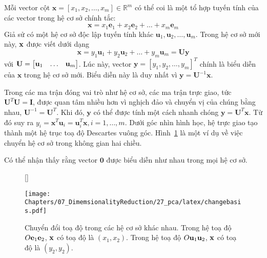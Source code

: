 Mỗi vector cột $\mathbf{x} = [x_1, x_2, \dots, x_m] \in \mathbb{R}^m$ có thể coi
là một tổ hợp tuyến tính của các vector trong hệ cơ sở chính tắc:
\begin{equation}
\mathbf{x} = x_1 \mathbf{e}_1 + x_2 \mathbf{e}_2 + \dots + x_m\mathbf{e}_m
\end{equation}
Giả sử có một hệ cơ sở độc lập tuyến tính khác $\mathbf{u}_1, \mathbf{u}_2,
\dots, \mathbf{u}_m$. Trong hệ cơ sở mới này, $\mathbf{x}$ được viết dưới dạng
\begin{equation}
\mathbf{x} = y_1 \mathbf{u}_1 + y_2 \mathbf{u}_2 + \dots + y_m\mathbf{u}_m =
\mathbf{U}\mathbf{y}
\end{equation}
với $\mathbf{U} = \left[\begin{matrix} \mathbf{u}_1 & \dots &\mathbf{u}_m\end{matrix}\right]$. Lúc này, vector $\mathbf{y} =
[y_1, y_2, \dots, y_m]^T$ chính là biểu diễn của $\mathbf{x}$ trong hệ cơ sở
mới. Biểu diễn này là duy nhất vì $\mathbf{y} =
\mathbf{U}^{-1} \mathbf{x}$.

Trong các ma trận đóng vai trò như hệ cơ sở, các ma
trận trực giao, tức $\mathbf{U}^T\mathbf{U} = \mathbf{I}$, được quan tâm nhiều
hơn vì nghịch đảo và chuyển vị của chúng bằng nhau, $\mathbf{U}^{-1} = \mathbf{U}^T$.
Khi đó, $\mathbf{y}$ có thể được tính một cách nhanh chóng $\mathbf{y} = \mathbf{U}^{T} \mathbf{x}$.
Từ đó suy ra $y_i = \mathbf{x}^T \mathbf{u}_i = \mathbf{u}_i^T\mathbf{x}, i= 1,
\dots, m$. Dưới góc nhìn hình học, hệ trực giao tạo thành một hệ trục toạ độ
Descartes vuông góc. Hình~\ref{fig:change_basis} là một ví dụ về việc chuyển hệ
cơ sở trong không gian hai chiều.

Có thể nhận thấy rằng vector $\mathbf{0}$ được biểu diễn như nhau trong mọi hệ
cơ sở.


\begin{figure}[t]
[\FBwidth]
{\caption{
Chuyển đổi toạ độ trong các hệ cơ sở khác nhau. Trong hệ toạ độ
$O\mathbf{e}_1\mathbf{e}_2$, $\mathbf{x}$ có toạ độ là $(x_1, x_2)$. Trong hệ toạ độ
$O\mathbf{u}_1\mathbf{u}_2$, $\mathbf{x}$ có toạ độ là $(y_2, y_2)$.
}
\label{fig:change_basis}}
{ %
\texttt{[image: Chapters/07\_DimemsionalityReduction/27\_pca/latex/changebasis.pdf]}
}
\end{figure}


